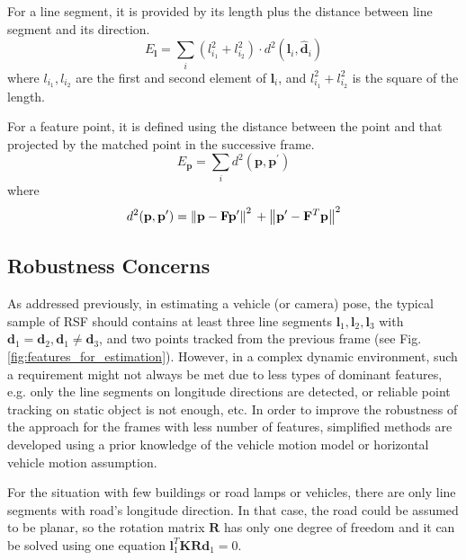 \documentclass[letterpaper, 10 pt, conference]{ieeeconf}  %
\begin{document}
For a line segment, it is provided by its length plus the distance between line segment and its direction.
\begin{equation}
E_\mathbf{l} = \sum_{i} \left(l_{i_1}^2+l_{i_2}^2\right) \cdot d^2(\mathbf{l}_i,\hat{\mathbf{d}}_i)
\end{equation}
where $l_{i_1},l_{i_2}$ are the first and second element of $\mathbf{l}_i$, and $l_{i_1}^2+l_{i_2}^2$ is the square of the length.

For a feature point, it is defined using the distance between the point and that projected by the matched point in the successive frame.
\begin{equation}
E_\mathbf{p} = \sum_{i} d^2(\mathbf{p}, \mathbf{p}^\prime)
\end{equation}
where
\begin{equation}
d^2(\mathbf{p}, \mathbf{p}^\prime)
= \left\| \mathbf{p} - \mathbf{F} \mathbf{p}^\prime \right\|^2 \\
+ \left\| \mathbf{p}^\prime - \mathbf{F}^T\mathbf{p} \right\|^2
\end{equation}

\subsection{Robustness Concerns}
As addressed previously, in estimating a vehicle (or camera) pose, the typical sample of RSF should contains at least three line segments $\mathbf{l}_1,\mathbf{l}_2,\mathbf{l}_3$ with $\mathbf{d}_1=\mathbf{d}_2,\mathbf{d}_1\neq \mathbf{d}_3$, and two points tracked from the previous frame (see Fig. \ref{fig:features_for_estimation}).
However, in a complex dynamic environment, such a requirement might not always be met due to less types of dominant features, e.g. only the line segments on longitude directions are detected, or reliable point tracking on static object is not enough, etc. In order to improve the robustness of the approach for the frames with less number of features, simplified methods are developed using a prior knowledge of the vehicle motion model or horizontal vehicle motion assumption.

For the situation with few buildings or road lamps or vehicles, there are only line segments with road's longitude direction. In that case, the road could be assumed to be planar, so the rotation matrix $\mathbf{R}$ has only one degree of freedom and it can be solved using one equation $\mathbf{l}_1^T\mathbf{K}\mathbf{R}\mathbf{d}_1=0$.
\end{document}
